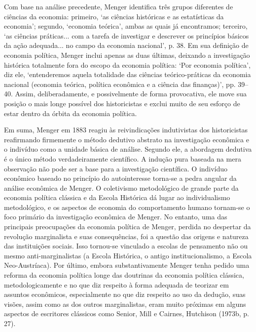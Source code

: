 \documentclass[12pt]{article}
\begin{document}
Com base na análise precedente, Menger identifica três grupos diferentes de ciências da economia: primeiro, ‘as ciências históricas e as estatísticas da economia’; segundo, ‘economia teórica’, ambas as quais já encontramos; terceiro, ‘as ciências práticas... com a tarefa de investigar e descrever os princípios básicos da ação adequada... no campo da economia nacional’, p. 38. Em sua definição de economia política, Menger inclui apenas as duas últimas, deixando a investigação histórica totalmente fora do escopo da economia política: ‘Por economia política’, diz ele, ‘entenderemos aquela totalidade das ciências teórico-práticas da economia nacional (economia teórica, política econômica e a ciência das finanças)’, pp. 39–40. Assim, deliberadamente, e possivelmente de forma provocativa, ele move sua posição o mais longe possível dos historicistas e exclui muito de seu esforço de estar dentro da órbita da economia política.

Em suma, Menger em 1883 reagiu às reivindicações indutivistas dos historicistas reafirmando firmemente o método dedutivo abstrato na investigação econômica e o indivíduo como a unidade básica de análise. Segundo ele, a abordagem dedutiva é o único método verdadeiramente científico. A indução pura baseada na mera observação não pode ser a base para a investigação científica. O indivíduo econômico baseado no princípio do autointeresse torna-se a pedra angular da análise econômica de Menger. O coletivismo metodológico de grande parte da economia política clássica e da Escola Histórica dá lugar ao individualismo metodológico, e os aspectos de economia do comportamento humano tornam-se o foco primário da investigação econômica de Menger. No entanto, uma das principais preocupações da economia política de Menger, perdida no despertar da revolução marginalista e suas consequências, foi a questão das origens e natureza das instituições sociais. Isso tornou-se vinculado a escolas de pensamento não ou mesmo anti-marginalistas (a Escola Histórica, o antigo institucionalismo, a Escola Neo-Austríaca). Por último, embora substantivamente Menger tenha pedido uma reforma da economia política longe das doutrinas da economia política clássica, metodologicamente e no que diz respeito à forma adequada de teorizar em assuntos econômicos, especialmente no que diz respeito ao uso da dedução, suas visões, assim como as dos outros marginalistas, eram muito próximas em alguns aspectos de escritores clássicos como Senior, Mill e Cairnes, Hutchison (1973b, p. 27).
\end{document}
